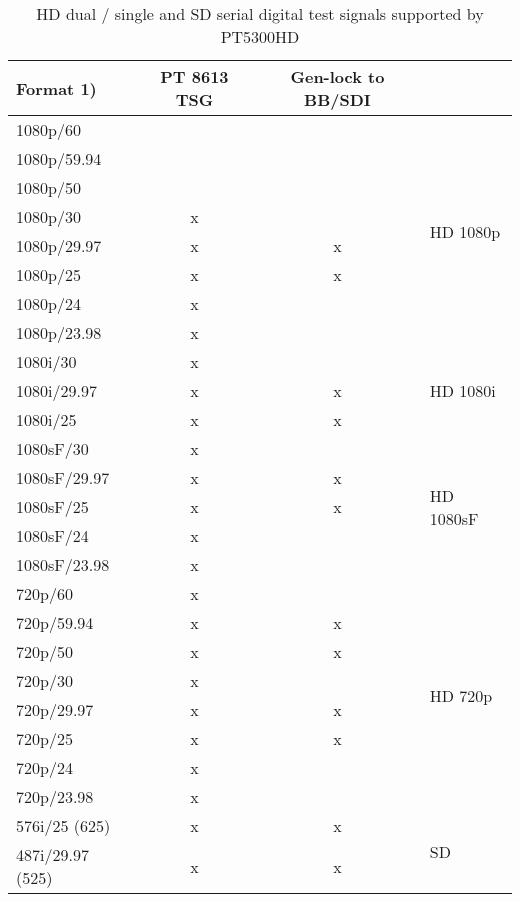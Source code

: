 \begin{table}[hbt]
\begin{tabular}{|l|c|c|p{0.5em}|}
\cline{1-3}
Format 1)			& PT 8613 TSG	& Gen-lock to BB/SDI \\
\cline{1-3}
\hline
1080p/60			&  	& 	& \multirow{8}{*}{\begin{sideways}{\tiny HD 1080p}\end{sideways}} \\
\cline{1-3}
1080p/59.94		&  	&		& \\
\cline{1-3}
1080p/50			&	 	&		& \\
\cline{1-3}
1080p/30			&	x	&		& \\
\cline{1-3}
1080p/29.97		&	x	&	x	& \\
\cline{1-3}
1080p/25			&	x	&	x	& \\
\cline{1-3}
1080p/24			&	x	&		& \\
\cline{1-3}
1080p/23.98		&	x	&		& \\
\hline
\hline
1080i/30			& x	& 	& \multirow{3}{2cm}{\begin{sideways}{\tiny HD 1080i}\end{sideways}} \\
\cline{1-3}
1080i/29.97 	& x & x & \\
\cline{1-3}
1080i/25 			& x & x & \\
\hline
\hline
1080sF/30			& x	& 	& \multirow{5}{2cm}{\begin{sideways}{\tiny HD 1080sF}\end{sideways}} \\
\cline{1-3}
1080sF/29.97	&	x	&	x	& \\
\cline{1-3}
1080sF/25			&	x	&	x	& \\
\cline{1-3}
1080sF/24			&	x	&		& \\
\cline{1-3}
1080sF/23.98	&	x	&		& \\
\hline
\hline
720p/60				& x	& 	& \multirow{8}{*}{\begin{sideways}{\tiny HD 720p}\end{sideways}} \\
\cline{1-3}
720p/59.94		& x	&	x	& \\
\cline{1-3}
720p/50				&	x	&	x	& \\
\cline{1-3}
720p/30				&	x	&		& \\
\cline{1-3}
720p/29.97		&	x	&	x	& \\
\cline{1-3}
720p/25				&	x	&	x	& \\
\cline{1-3}
720p/24				&	x	&		& \\
\cline{1-3}
720p/23.98		&	x	&		& \\
\hline
\hline
576i/25 (625)			& x	& x	& \multirow{2}{*}{\begin{sideways}{\tiny SD}\end{sideways}} \\
\cline{1-3}
487i/29.97 (525)	&	x	&	x	& \\
\hline
\end{tabular}
\caption{HD dual / single and SD serial digital test signals supported by PT5300HD}
\label{tab:8613formats}
\end{table}

